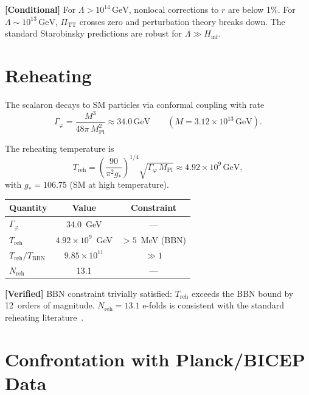 \documentclass[11pt,a4paper]{article}
\theoremstyle{plain}
\theoremstyle{definition}
\newcommand{\verified}[1]{%
  \par\smallskip\noindent
  \colorbox{green!10}{\parbox{\dimexpr\linewidth-2\fboxsep}{%
    \textcolor{green!50!black}{\textbf{[Verified]}} #1}}%
  \par\smallskip}
\newcommand{\conditional}[1]{%
  \par\smallskip\noindent
  \colorbox{yellow!15}{\parbox{\dimexpr\linewidth-2\fboxsep}{%
    \textcolor{orange!60!black}{\textbf{[Conditional]}} #1}}%
  \par\smallskip}
\begin{document}
\conditional{For $\Lambda > 10^{14}\,\mathrm{GeV}$, nonlocal corrections
to $r$ are below 1\%.  For $\Lambda \sim 10^{13}\,\mathrm{GeV}$,
$\Pi_{\mathrm{TT}}$ crosses zero and perturbation theory breaks down.
The standard Starobinsky predictions are robust for
$\Lambda \gg H_{\mathrm{inf}}$.}

\section{Reheating}\label{sec:reheating}

The scalaron decays to SM particles via conformal coupling with rate
\begin{equation}\label{eq:Gamma}
  \Gamma_\varphi = \frac{M^3}{48\pi\,M_{\mathrm{Pl}}^2}
  \approx 34.0\,\mathrm{GeV}
  \qquad (M = 3.12 \times 10^{13}\,\mathrm{GeV}).
\end{equation}

The reheating temperature is
\begin{equation}\label{eq:T-reh}
  T_{\mathrm{reh}}
  = \left(\frac{90}{\pi^2 g_*}\right)^{1/4}
  \sqrt{\Gamma_\varphi\,M_{\mathrm{Pl}}}
  \approx 4.92 \times 10^9\,\mathrm{GeV},
\end{equation}
with $g_* = 106.75$ (SM at high temperature).

\begin{center}
\begin{tabular}{lcc}
\toprule
Quantity & Value & Constraint \\
\midrule
$\Gamma_\varphi$ & 34.0~GeV & --- \\
$T_{\mathrm{reh}}$ & $4.92 \times 10^9$~GeV & $> 5$~MeV (BBN) \\
$T_{\mathrm{reh}} / T_{\mathrm{BBN}}$ & $9.85 \times 10^{11}$ & $\gg 1$ \\
$N_{\mathrm{reh}}$ & 13.1 & --- \\
\bottomrule
\end{tabular}
\end{center}

\verified{BBN constraint trivially satisfied: $T_{\mathrm{reh}}$ exceeds
the BBN bound by 12~orders of magnitude.  $N_{\mathrm{reh}} = 13.1$
e-folds is consistent with the standard reheating
literature~\cite{Kofman97,Vilenkin85}.}

\section{Confrontation with Planck/BICEP Data}\label{sec:cmb}
\end{document}
